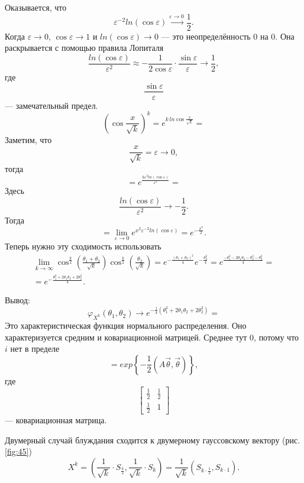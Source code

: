 \begin{enumerate}[label=\alph*)]
  Оказывается, что
  $$ \varepsilon^{-2} ln \left( \cos \varepsilon \right) \overset{ \varepsilon \to 0}{ \to }
    \frac{1}{2}.$$
  Когда $ \varepsilon \to 0, \, \cos \varepsilon \to 1$ и
  $ln \left( \cos \varepsilon \right) \to 0$ --- это неопределённость 0 на 0.
  Она раскрывается с помощью правила Лопиталя
  $$ \frac{ln \left( \cos \varepsilon \right) }{ \varepsilon^2} \approx
    -\frac{1}{2 \cos \varepsilon } \cdot \frac{ \sin \varepsilon }{ \varepsilon } \to
    \frac{1}{2},$$
  где
  $$ \frac{ \sin \varepsilon }{ \varepsilon }$$
  --- замечательный предел.
  $$ \left( \cos \frac{x}{ \sqrt{k}} \right)^k =
    e^{k \, ln \cos \frac{x}{ \sqrt{k}}} =$$
  Заметим, что
  $$ \frac{x}{ \sqrt{k}} =
    \varepsilon \to
    0,$$
  тогда
  $$= e^{ \frac{k \varepsilon^2 ln \left( \cos \varepsilon \right) }{ \varepsilon^2}} =$$
  Здесь
  $$ \frac{ln \left( \cos \varepsilon \right) }{ \varepsilon^2} \to
    -\frac{1}{2}.$$
  Тогда
  $$= \lim \limits_{ \varepsilon \to 0}
    e^{x^2 \varepsilon^{-2} ln \left( \cos \varepsilon \right) } =
  e^{-\frac{x^2}{2}}.$$
  Теперь нужно эту сходимость использовать
  \begin{gather*}
    \lim \limits_{k \to \infty }
      \cos^{ \frac{k}{2}} \left( \frac{ \theta_1 + \theta_2}{ \sqrt{k}} \right)
      \cos^{ \frac{k}{2}} \left( \frac{ \theta_2}{ \sqrt{k}} \right) =
    e^{-\frac{ \left( \theta_1 + \theta_2 \right)^2}{4}} e^{-\frac{ \theta_2^2}{4}} =
    e^{ \frac{-\theta_1^2 - 2 \theta_1 \theta_2 - \theta_2^2 - \theta_2^2}{4}} = \\
    = e^{-\frac{ \theta_1^2 + 2 \theta_1 \theta_2 + 2 \theta_2^2}{4}}.
  \end{gather*}

  Вывод:
  $$ \varphi_{X^k} \left( \theta_1, \theta_2 \right) \to
    e^{-\frac{1}{4} \left( \theta_1^2 + 2 \theta_1 \theta_2 + 2 \theta_2^2 \right) } =$$
  Это характеристическая функция нормального распределения.
  Оно характеризуется средним и ковариационной матрицей.
  Среднее тут 0, потому что $i$ нет в пределе
  $$= exp \left\{ -\frac{1}{2} \left( A \vec{ \theta }, \vec{ \theta } \right) \right\},$$
  где
  $$ \begin{bmatrix}
      \frac{1}{2} & \frac{1}{2} \\
      \frac{1}{2} & 1
    \end{bmatrix}$$
  --- ковариационная матрица.

  Двумерный случай блуждания сходится к двумерному гауссовскому вектору (рис. \ref{fig:45})
  $$X^k =
    \left( \frac{1}{ \sqrt{k}} \cdot S_{ \frac{k}{2}}, \frac{1}{ \sqrt{k}} \cdot S_k \right) =
    \frac{1}{ \sqrt{k}} \left( S_{k \cdot \frac{1}{2}}, S_{k \cdot 1} \right).$$


\end{enumerate}
